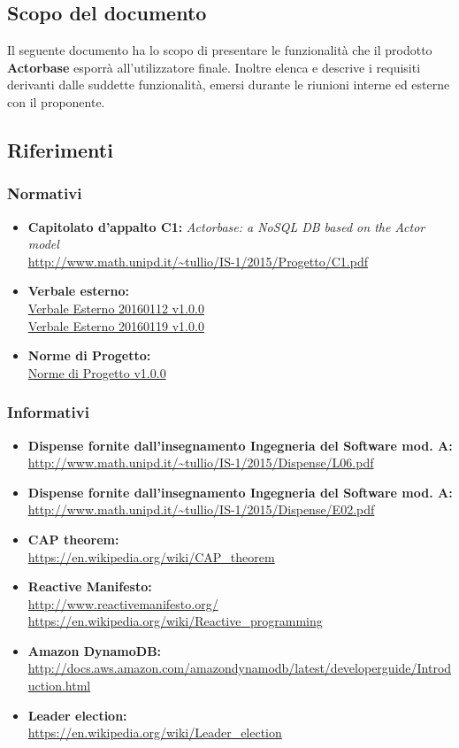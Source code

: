 \documentclass{scalatekids-article}
\begin{document}
\subsection{Scopo del documento}
Il seguente documento ha lo scopo di presentare le funzionalità che il prodotto
\textbf{Actorbase} esporrà all'utilizzatore finale. Inoltre elenca e descrive i
requisiti derivanti dalle suddette funzionalità, emersi durante le riunioni
interne ed esterne con il proponente.
\prodPurpose \glossExpl
\subsection{Riferimenti}
\subsubsection{Normativi}
\begin{itemize}
\item\textbf{Capitolato d'appalto C1:} \textit{Actorbase: a NoSQL DB based on the Actor model}\\
  \url{http://www.math.unipd.it/~tullio/IS-1/2015/Progetto/C1.pdf}
\item\textbf{Verbale esterno:}\\
  \href{run:VerbaleEsterno20160112\_v1.0.0.pdf}{Verbale Esterno 20160112 v1.0.0}\\
  \href{run:VerbaleEsterno20160119\_v1.0.0.pdf}{Verbale Esterno 20160119 v1.0.0}
\item\textbf{Norme di Progetto:}\\
  \href{run:../Interni/NormeDiProgetto\_v1.0.0.pdf}{Norme di Progetto v1.0.0}
\end{itemize}
\subsubsection{Informativi}
\begin{itemize}
\item\textbf{Dispense fornite dall'insegnamento Ingegneria del Software mod. A:}\\
  \url{http://www.math.unipd.it/~tullio/IS-1/2015/Dispense/L06.pdf}
\item\textbf{Dispense fornite dall'insegnamento Ingegneria del Software mod. A:}\\
  \url{http://www.math.unipd.it/~tullio/IS-1/2015/Dispense/E02.pdf}
\item\textbf{CAP theorem:}\\
  \url{https://en.wikipedia.org/wiki/CAP_theorem}
\item\textbf{Reactive Manifesto:}\\
  \url{http://www.reactivemanifesto.org/}\\
  \url{https://en.wikipedia.org/wiki/Reactive_programming}
\item\textbf{Amazon DynamoDB:}\\
  \url{http://docs.aws.amazon.com/amazondynamodb/latest/developerguide/Introduction.html}
\item\textbf{Leader election:}\\
  \url{https://en.wikipedia.org/wiki/Leader_election}
\end{itemize}
\end{document}
